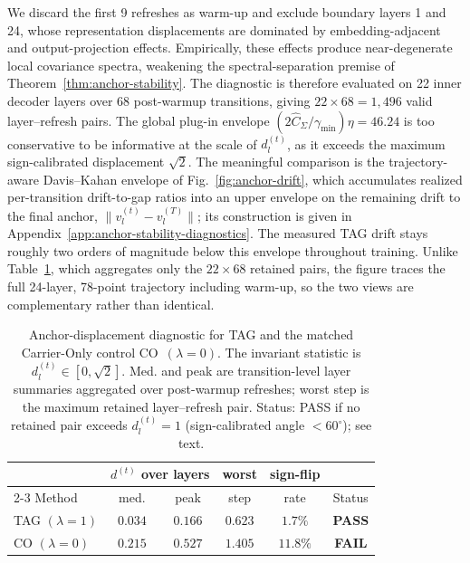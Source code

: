 We discard the first 9 refreshes as warm-up and exclude boundary
layers 1 and 24, whose representation displacements are dominated by
embedding-adjacent and output-projection effects. Empirically, these
effects produce near-degenerate local covariance spectra, weakening the
spectral-separation premise of Theorem~\ref{thm:anchor-stability}. The
diagnostic is therefore evaluated on 22 inner decoder layers over 68
post-warmup transitions, giving \(22\times68=1{,}496\) valid
layer--refresh pairs. The global plug-in envelope
\((2\widehat C_{\Sigma}/\gamma_{\min})\eta=46.24\) is too conservative
to be informative at the scale of \(d_l^{(t)}\), as it exceeds the
maximum sign-calibrated displacement \(\sqrt{2}\). The meaningful
comparison is the trajectory-aware Davis--Kahan envelope of
Fig.~\ref{fig:anchor-drift}, which accumulates realized
per-transition drift-to-gap ratios into an upper envelope on the
remaining drift to the final anchor,
\(\|v_l^{(t)}-v_l^{(T)}\|\); its construction is given in
Appendix~\ref{app:anchor-stability-diagnostics}. The measured
\textsc{TAG} drift stays roughly two orders of magnitude below this
envelope throughout training. Unlike
Table~\ref{tab:dstep-spread}, which aggregates only the
\(22\times68\) retained pairs, the figure traces the full
24-layer, 78-point trajectory including warm-up, so the two views
are complementary rather than identical.

\begin{table}[t]
\centering
\caption{Anchor-displacement diagnostic for \textsc{TAG} and the
matched Carrier-Only control CO~\((\lambda{=}0)\). The invariant
statistic is \(d_l^{(t)}\in[0,\sqrt{2}]\). Med. and peak are
transition-level layer summaries aggregated over post-warmup
refreshes; worst step is the maximum retained layer--refresh pair.
Status: PASS if no retained pair exceeds \(d_l^{(t)}=1\)
(sign-calibrated angle \(<60^\circ\)); see text.}
\label{tab:dstep-spread}

\small
\setlength{\tabcolsep}{4pt}
\begin{tabular}{@{}lccccc@{}}
\toprule
 & \multicolumn{2}{c}{\(d^{(t)}\) over layers}
 & worst & sign-flip & \\
\cmidrule(lr){2-3}
Method & med. & peak & step & rate & Status \\
\midrule
\textsc{TAG} \((\lambda=1)\)
 & \(0.034\) & \(0.166\) & \(0.623\) & \(1.7\%\) & \textbf{PASS} \\
CO \((\lambda=0)\)
 & \(0.215\) & \(0.527\) & \(1.405\) & \(\mathbf{11.8\%}\) & \textbf{FAIL} \\
\bottomrule
\end{tabular}
\end{table}

